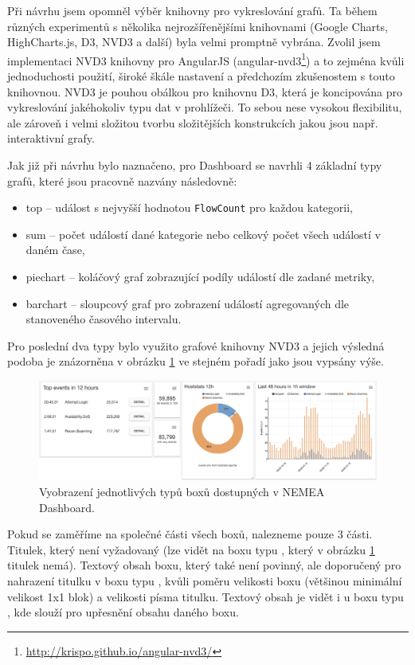 Při návrhu jsem opomněl výběr knihovny pro vykreslování grafů. Ta během různých experimentů s několika nejrozšířenějšími knihovnami (Google Charts, HighCharts.js, D3, NVD3 a další) byla velmi promptně vybrána. Zvolil jsem implementaci NVD3 knihovny pro AngularJS (angular-nvd3\footnote{\url{http://krispo.github.io/angular-nvd3/}}) a to zejména kvůli jednoduchosti použití, široké škále nastavení a předchozím zkušenostem s touto knihovnou. NVD3 je pouhou obálkou pro knihovnu D3, která je koncipována pro vykreslování jakéhokoliv typu dat v prohlížeči. To sebou nese vysokou flexibilitu, ale zároveň i velmi složitou tvorbu složitějších konstrukcích jakou jsou např. interaktivní grafy.

Jak již při návrhu bylo naznačeno, pro Dashboard se navrhli 4 základní typy grafů, které jsou pracovně nazvány následovně:

\begin{itemize}
    \item top -- událost s nejvyšší hodnotou \texttt{FlowCount} pro každou kategorii,
    \item sum -- počet událostí dané kategorie nebo celkový počet všech událostí v daném čase,
    \item piechart -- koláčový graf zobrazující podíly událostí dle zadané metriky,
    \item barchart -- sloupcový graf pro zobrazení událostí agregovaných dle stanoveného časového intervalu.
\end{itemize}

Pro poslední dva typy bylo využito grafové knihovny NVD3 a jejich výsledná podoba je znázorněna v obrázku \ref{fig:boxes} ve stejném pořadí jako jsou vypsány výše.

\begin{figure}[ht]
    \centering
    \includegraphics[width=\textwidth]{fig/boxes.png}
    \caption{Vyobrazení jednotlivých typů boxů dostupných v NEMEA Dashboard.} \label{fig:boxes}
\end{figure}

Pokud se zaměříme na společné části všech boxů, nalezneme pouze 3 části. Titulek, který není vyžadovaný (lze vidět na boxu typu , který v obrázku \ref{fig:boxes} titulek nemá). Textový obsah boxu, který také není povinný, ale doporučený pro nahrazení titulku v boxu typu , kvůli poměru velikosti boxu (většinou minimální velikost 1x1 blok) a velikosti písma titulku. Textový obsah je vidět i u boxu typu , kde slouží pro upřesnění obsahu daného boxu.

